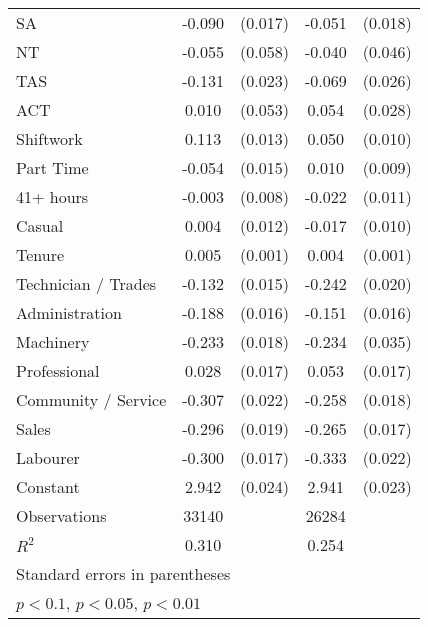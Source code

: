 {\begin{tabular}{l*{2}{cc}}
SA                  &      -0.090\sym{***}&     (0.017)&      -0.051\sym{***}&     (0.018)\\
NT                  &      -0.055         &     (0.058)&      -0.040         &     (0.046)\\
TAS                 &      -0.131\sym{***}&     (0.023)&      -0.069\sym{***}&     (0.026)\\
ACT                 &       0.010         &     (0.053)&       0.054\sym{*}  &     (0.028)\\
Shiftwork           &       0.113\sym{***}&     (0.013)&       0.050\sym{***}&     (0.010)\\
Part Time           &      -0.054\sym{***}&     (0.015)&       0.010         &     (0.009)\\
41+ hours           &      -0.003         &     (0.008)&      -0.022\sym{**} &     (0.011)\\
Casual              &       0.004         &     (0.012)&      -0.017\sym{*}  &     (0.010)\\
Tenure              &       0.005\sym{***}&     (0.001)&       0.004\sym{***}&     (0.001)\\
Technician / Trades &      -0.132\sym{***}&     (0.015)&      -0.242\sym{***}&     (0.020)\\
Administration      &      -0.188\sym{***}&     (0.016)&      -0.151\sym{***}&     (0.016)\\
Machinery           &      -0.233\sym{***}&     (0.018)&      -0.234\sym{***}&     (0.035)\\
Professional        &       0.028         &     (0.017)&       0.053\sym{***}&     (0.017)\\
Community / Service &      -0.307\sym{***}&     (0.022)&      -0.258\sym{***}&     (0.018)\\
Sales               &      -0.296\sym{***}&     (0.019)&      -0.265\sym{***}&     (0.017)\\
Labourer            &      -0.300\sym{***}&     (0.017)&      -0.333\sym{***}&     (0.022)\\
Constant            &       2.942\sym{***}&     (0.024)&       2.941\sym{***}&     (0.023)\\
\hline
Observations        &       33140         &            &       26284         &            \\
\(R^{2}\)           &       0.310         &            &       0.254         &            \\
\hline\hline
\multicolumn{5}{l}{\footnotesize Standard errors in parentheses}\\
\multicolumn{5}{l}{\footnotesize \sym{*} \(p<0.1\), \sym{**} \(p<0.05\), \sym{***} \(p<0.01\)}\\
\end{tabular}
}
